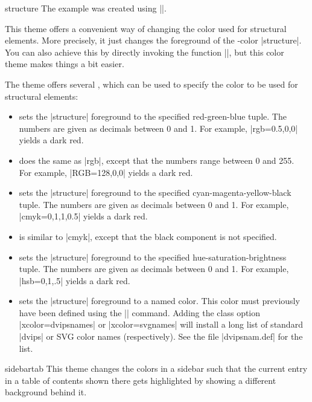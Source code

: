 \begin{colorthemeexample}{structure}
  The example was created using ||.

  This theme offers a convenient way of changing the color used for structural elements. More precisely, it just changes the foreground of the \beamer-color |structure|. You can also achieve this by directly invoking the function |\setbeamercolor|, but this color theme makes things a bit easier.

  The theme offers several , which can be used to specify the color to be used for structural elements:
  \begin{itemize}
  \item
     sets the |structure| foreground to the specified red-green-blue tuple. The numbers are given as decimals between 0 and 1. For example, |rgb={0.5,0,0}| yields a dark red.
  \item
     does the same as |rgb|, except that the numbers range between 0 and 255. For example, |RGB={128,0,0}|  yields a dark red.
  \item
     sets the |structure| foreground to the specified cyan-magenta-yellow-black tuple. The numbers are given as decimals between 0 and 1. For example, |cmyk={0,1,1,0.5}| yields a dark red.
  \item
     is similar to |cmyk|, except that the black component is not specified.
  \item
      sets the |structure| foreground to the specified hue-saturation-brightness tuple. The numbers are given as decimals between 0 and 1. For example, |hsb={0,1,.5}| yields a dark red.
  \item
     sets the |structure| foreground to a named color. This color must previously have been defined using the |\DefineNamedColor| command. Adding the class option |xcolor=dvipsnames| or |xcolor=svgnames| will install a long list of standard |dvips| or SVG color names (respectively). See the file |dvipsnam.def| for the list.
  \end{itemize}
\end{colorthemeexample}

\begin{colorthemeexample}{sidebartab}
  This theme changes the colors in a sidebar such that the current entry in a table of contents shown there gets highlighted by showing a different background behind it.
\end{colorthemeexample}

